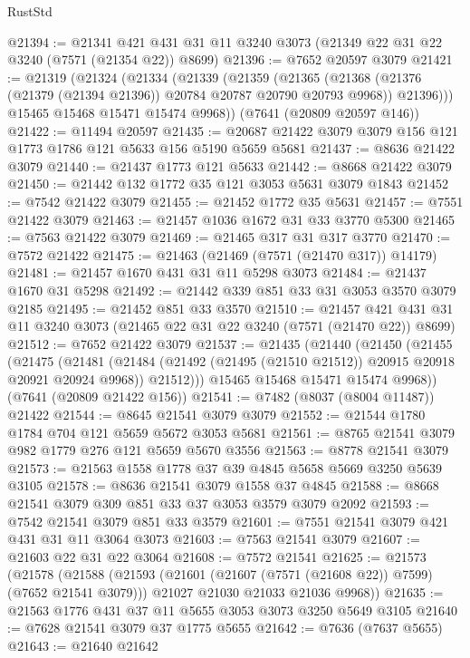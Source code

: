 \begin{lexlean}{RustStd}
\begin{coremodule}
@21394 := @21341 @421 @431 @31 @11 @3240 @3073 (@21349 @22 @31 @22 @3240 (@7571 (@21354 @22)) @8699)
@21396 := @7652 @20597 @3079
@21421 := @21319
    (@21324
      (@21334
        (@21339
          (@21359
            (@21365
              (@21368 (@21376 (@21379 (@21394 @21396)) @20784 @20787 @20790 @20793 @9968))
              @21396)))
        @15465
        @15468
        @15471
        @15474
        @9968))
    (@7641 (@20809 @20597 @146))
@21422 := @11494 @20597
@21435 := @20687 @21422 @3079 @3079 @156 @121 @1773 @1786 @121 @5633 @156 @5190 @5659 @5681
@21437 := @8636 @21422 @3079
@21440 := @21437 @1773 @121 @5633
@21442 := @8668 @21422 @3079
@21450 := @21442 @132 @1772 @35 @121 @3053 @5631 @3079 @1843
@21452 := @7542 @21422 @3079
@21455 := @21452 @1772 @35 @5631
@21457 := @7551 @21422 @3079
@21463 := @21457 @1036 @1672 @31 @33 @3770 @5300
@21465 := @7563 @21422 @3079
@21469 := @21465 @317 @31 @317 @3770
@21470 := @7572 @21422
@21475 := @21463 (@21469 (@7571 (@21470 @317)) @14179)
@21481 := @21457 @1670 @431 @31 @11 @5298 @3073
@21484 := @21437 @1670 @31 @5298
@21492 := @21442 @339 @851 @33 @31 @3053 @3570 @3079 @2185
@21495 := @21452 @851 @33 @3570
@21510 := @21457 @421 @431 @31 @11 @3240 @3073 (@21465 @22 @31 @22 @3240 (@7571 (@21470 @22)) @8699)
@21512 := @7652 @21422 @3079
@21537 := @21435
    (@21440
      (@21450
        (@21455
          (@21475
            (@21481
              (@21484 (@21492 (@21495 (@21510 @21512)) @20915 @20918 @20921 @20924 @9968))
              @21512)))
        @15465
        @15468
        @15471
        @15474
        @9968))
    (@7641 (@20809 @21422 @156))
@21541 := @7482 (@8037 (@8004 @11487)) @21422
@21544 := @8645 @21541 @3079 @3079
@21552 := @21544 @1780 @1784 @704 @121 @5659 @5672 @3053 @5681
@21561 := @8765 @21541 @3079 @982 @1779 @276 @121 @5659 @5670 @3556
@21563 := @8778 @21541 @3079
@21573 := @21563 @1558 @1778 @37 @39 @4845 @5658 @5669 @3250 @5639 @3105
@21578 := @8636 @21541 @3079 @1558 @37 @4845
@21588 := @8668 @21541 @3079 @309 @851 @33 @37 @3053 @3579 @3079 @2092
@21593 := @7542 @21541 @3079 @851 @33 @3579
@21601 := @7551 @21541 @3079 @421 @431 @31 @11 @3064 @3073
@21603 := @7563 @21541 @3079
@21607 := @21603 @22 @31 @22 @3064
@21608 := @7572 @21541
@21625 := @21573
    (@21578
      (@21588
        (@21593 (@21601 (@21607 (@7571 (@21608 @22)) @7599) (@7652 @21541 @3079)))
        @21027
        @21030
        @21033
        @21036
        @9968))
@21635 := @21563 @1776 @431 @37 @11 @5655 @3053 @3073 @3250 @5649 @3105
@21640 := @7628 @21541 @3079 @37 @1775 @5655
@21642 := @7636 (@7637 @5655)
@21643 := @21640 @21642

\end{coremodule}
\end{lexlean}
